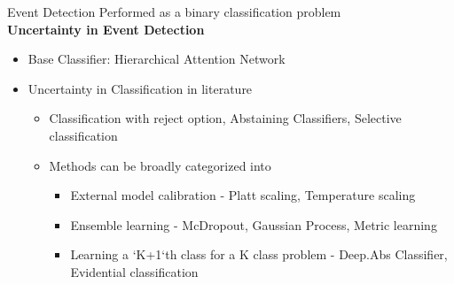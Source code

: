 \begin{frame}{Event Detection}
Performed as a binary classification problem \\
\textbf{Uncertainty in Event Detection}
\begin{itemize}
    \item Base Classifier: Hierarchical Attention Network ~\cite{yang2016hierarchical}
    \item Uncertainty in Classification in literature
    \begin{itemize}
        \item Classification with reject option, Abstaining Classifiers, Selective classification 
        \item Methods can be broadly categorized into
        \begin{itemize}
            \item External model calibration - Platt scaling, Temperature scaling
            \item Ensemble learning - McDropout, Gaussian Process, Metric learning
            \item Learning a `K+1`th class for a K class problem - Deep.Abs Classifier, Evidential classification
        \end{itemize}
    \end{itemize}
    \end{itemize}
\end{frame}

